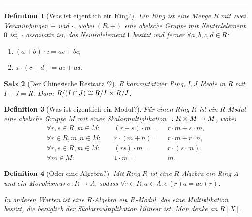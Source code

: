 \documentclass[a4paper]{article}
\newcounter{Sec}
\theoremstyle{marginbreak}
\newtheorem{definition}{Definition}[Sec]
\newtheorem{satz}[definition]{Satz}
\newcommand{\sep}{%
	\rule{\textwidth}{0.3pt}%
	\stepcounter{Sec}%
	}
\begin{document}
\sep
\begin{definition}[Was ist eigentlich ein Ring?]
	Ein Ring ist eine Menge $R$ mit zwei Verknüpfungen $+$ und $\cdot$, wobei
	$(R, +)$ eine abelsche Gruppe mit Neutralelement $0$ ist, $\cdot$ assoziativ ist,
	das Neutralelement $1$ besitzt und ferner $\forall a, b, c, d\in R$:
	\begin{enumerate}[label=(\alph*)]
		\item $(a+b)\cdot c = ac+bc$,
		\item $a\cdot(c+d)=ac+ad$.
	\end{enumerate}
\end{definition}
\begin{satz}[Der Chinesische Restsatz $\heartsuit$]
	$R$ kommutativer Ring, $I, J$ Ideale in R mit $I+J=R$. Dann $R/(I\cap J)\cong R/I\cross R/J$.
\end{satz}
\begin{definition}[Was ist eigentlich ein Modul?]
	Für einen Ring $R$ ist ein $R$-Modul eine abelsche Gruppe $M$ mit einer
	Skalarmultiplikation $\cdot\colon R\cross M\to M$, wobei
	\begin{alignat*}
		\forall r, s\in R, m\in M: &&\  (r+s)\cdot m=&\ r\cdot m + s\cdot m,\\
		\forall r\in R, m, n\in M: &&\ r\cdot(m+n) =&\ r\cdot m + r\cdot n,\\
		\forall r,s\in R, m\in M: &&\ (rs)\cdot m =&\ r\cdot(s \cdot m),\\
		\forall m\in M: &&\ 1\cdot m =&\ m.
	\end{alignat*}
\end{definition}
\begin{definition}[Oder eine Algebra?]
	Mit Ring $R$ ist eine $R$-Algebra ein Ring $A$ und ein Morphismus
	$\sigma\colon R\to A$, sodass $\forall r\in R, a\in A:\sigma(r) a = a\sigma(r)$.

	In anderen Worten ist eine $R$-Algebra ein $R$-Modul, das eine Multiplikation
	besitzt, die bezüglich der Skalarmultiplikation bilinear ist. Man denke an
	$R[X]$.
\end{definition}
\end{document}

